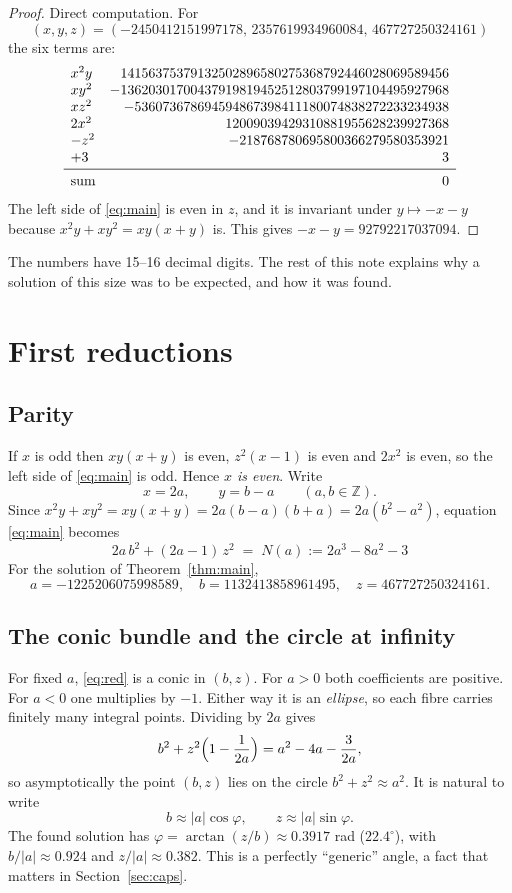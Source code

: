 \documentclass[11pt]{article}
\theoremstyle{remark}
\theoremstyle{definition}
\newcommand{\Z}{\mathbb{Z}}
\begin{document}
\begin{proof}
Direct computation.  For
\[(x,y,z)=(-2450412151997178,\,2357619934960084,\,467727250324161)\]
the six terms are:
\[
\begin{array}{lr}
x^2y   & 14156375379132502896580275368792446028069589456\\
xy^2   & -13620301700437919819452512803799197104495927968\\
xz^2   & -536073678694594867398411180074838272233234938\\
2x^2   & 12009039429310881955628239927368\\
-z^2   & -218768780695800366279580353921\\
+3     & 3\\\midrule
\text{sum} & 0
\end{array}
\]
The left side of \eqref{eq:main} is even in $z$, and it is invariant under $y\mapsto -x-y$
because $x^2y+xy^2=xy(x+y)$ is.  This gives $-x-y=92792217037094$.
\end{proof}

The numbers have 15--16 decimal digits.  The rest of this note explains why a solution of this
size was to be expected, and how it was found.

\section{First reductions}

\subsection{Parity}
If $x$ is odd then $xy(x+y)$ is even, $z^2(x-1)$ is even and $2x^2$ is even, so the left side of
\eqref{eq:main} is odd.  Hence \emph{$x$ is even}.  Write
\[
x=2a,\qquad y=b-a\qquad (a,b\in\Z).
\]
Since $x^2y+xy^2=xy(x+y)=2a(b-a)(b+a)=2a(b^2-a^2)$, equation \eqref{eq:main} becomes
\begin{equation}\label{eq:red}
\boxed{\;2a\,b^2+(2a-1)\,z^2 \;=\; N(a):=2a^3-8a^2-3\;}
\end{equation}
For the solution of Theorem~\ref{thm:main},
\[a=-1225206075998589,\quad b=1132413858961495,\quad z=467727250324161.\]

\subsection{The conic bundle and the circle at infinity}
For fixed $a$, \eqref{eq:red} is a conic in $(b,z)$.  For $a>0$ both coefficients are positive.
For $a<0$ one multiplies by $-1$.  Either way it is an \emph{ellipse}, so each fibre carries
finitely many integral points.  Dividing by $2a$ gives
\[
b^2+z^2\Bigl(1-\frac1{2a}\Bigr)=a^2-4a-\frac{3}{2a},
\]
so asymptotically the point $(b,z)$ lies on the circle $b^2+z^2\approx a^2$.  It is natural to write
\[
b\approx |a|\cos\varphi,\qquad z\approx |a|\sin\varphi .
\]
The found solution has $\varphi=\arctan(z/b)\approx 0.3917$ rad ($22.4^\circ$), with
$b/|a|\approx 0.924$ and $z/|a|\approx 0.382$.  This is a perfectly ``generic'' angle, a fact that
matters in Section~\ref{sec:caps}.
\end{document}
